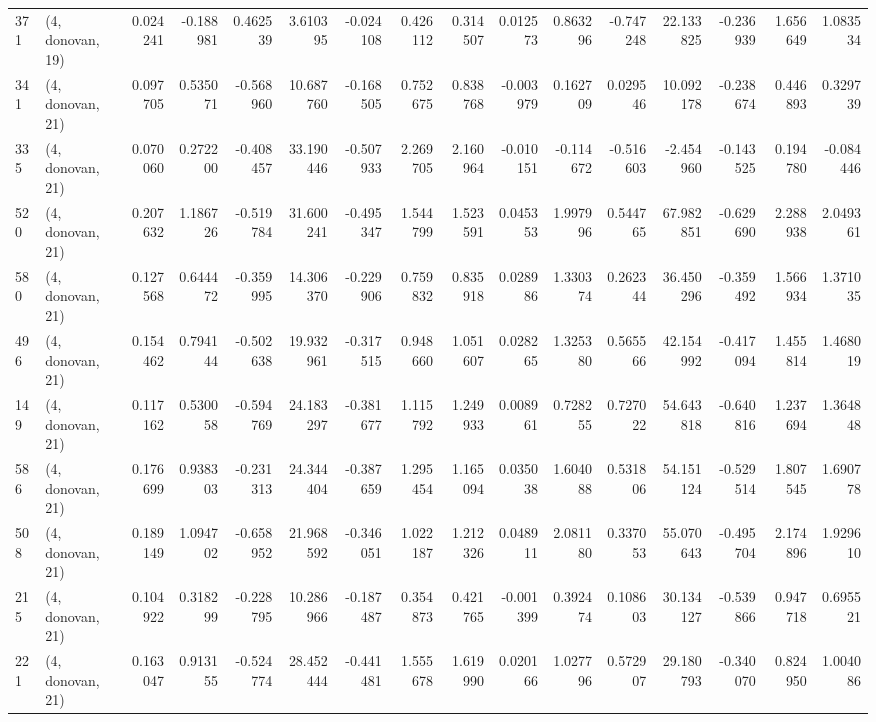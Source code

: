 \begin{tabular}{llrrrrrrrrrrrrrr}
371 &  (4, donovan, 19) &   0.024241 & -0.188981 &  0.462539 &    3.610395 & -0.024108 &   0.426112 &   0.314507 &  0.012573 &  0.863296 & -0.747248 &   22.133825 & -0.236939 &   1.656649 &   1.083534 \\
341 &  (4, donovan, 21) &   0.097705 &  0.535071 & -0.568960 &   10.687760 & -0.168505 &   0.752675 &   0.838768 & -0.003979 &  0.162709 &  0.029546 &   10.092178 & -0.238674 &   0.446893 &   0.329739 \\
335 &  (4, donovan, 21) &   0.070060 &  0.272200 & -0.408457 &   33.190446 & -0.507933 &   2.269705 &   2.160964 & -0.010151 & -0.114672 & -0.516603 &   -2.454960 & -0.143525 &   0.194780 &  -0.084446 \\
520 &  (4, donovan, 21) &   0.207632 &  1.186726 & -0.519784 &   31.600241 & -0.495347 &   1.544799 &   1.523591 &  0.045353 &  1.997996 &  0.544765 &   67.982851 & -0.629690 &   2.288938 &   2.049361 \\
580 &  (4, donovan, 21) &   0.127568 &  0.644472 & -0.359995 &   14.306370 & -0.229906 &   0.759832 &   0.835918 &  0.028986 &  1.330374 &  0.262344 &   36.450296 & -0.359492 &   1.566934 &   1.371035 \\
496 &  (4, donovan, 21) &   0.154462 &  0.794144 & -0.502638 &   19.932961 & -0.317515 &   0.948660 &   1.051607 &  0.028265 &  1.325380 &  0.565566 &   42.154992 & -0.417094 &   1.455814 &   1.468019 \\
149 &  (4, donovan, 21) &   0.117162 &  0.530058 & -0.594769 &   24.183297 & -0.381677 &   1.115792 &   1.249933 &  0.008961 &  0.728255 &  0.727022 &   54.643818 & -0.640816 &   1.237694 &   1.364848 \\
586 &  (4, donovan, 21) &   0.176699 &  0.938303 & -0.231313 &   24.344404 & -0.387659 &   1.295454 &   1.165094 &  0.035038 &  1.604088 &  0.531806 &   54.151124 & -0.529514 &   1.807545 &   1.690778 \\
508 &  (4, donovan, 21) &   0.189149 &  1.094702 & -0.658952 &   21.968592 & -0.346051 &   1.022187 &   1.212326 &  0.048911 &  2.081180 &  0.337053 &   55.070643 & -0.495704 &   2.174896 &   1.929610 \\
215 &  (4, donovan, 21) &   0.104922 &  0.318299 & -0.228795 &   10.286966 & -0.187487 &   0.354873 &   0.421765 & -0.001399 &  0.392474 &  0.108603 &   30.134127 & -0.539866 &   0.947718 &   0.695521 \\
221 &  (4, donovan, 21) &   0.163047 &  0.913155 & -0.524774 &   28.452444 & -0.441481 &   1.555678 &   1.619990 &  0.020166 &  1.027796 &  0.572907 &   29.180793 & -0.340070 &   0.824950 &   1.004086 \\

\end{tabular}
